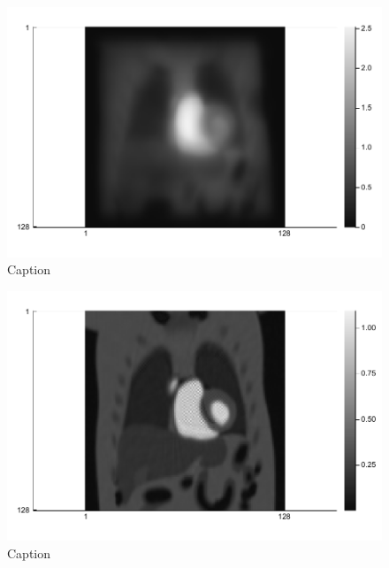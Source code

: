 \begin{figure}
    \centering
    \includegraphics[width=0.46\linewidth]{images/PINCAT_MSLR_recon.pdf}
    \caption{Caption}
    \label{fig:PINCAT_MSLR_recon}
\end{figure}

\begin{figure}
    \centering
    \includegraphics[width=0.46\linewidth]{images/PINCAT_POGM_recon.pdf}
    \caption{Caption}
    \label{fig:PINCAT_POGM_recon}
\end{figure}
\fi

\clearpage %
